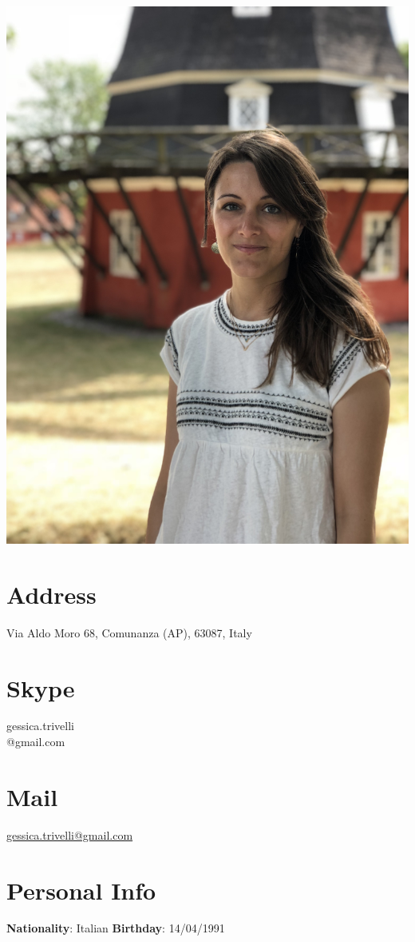 \documentclass[11pt]{friggeri-cv}
\begin{document}
  \begin{aside}
    \includegraphics[width=0.95\columnwidth]{img/IMG_2838}
    \section{Address}\footnotesize{
    Via Aldo Moro 68,
    Comunanza (AP), 63087, Italy}
    \section{Skype}\footnotesize{
    gessica.trivelli\\@gmail.com}
    \section{Mail}\footnotesize{
    \href{mailto:gessica.trivelli@gmail.com}{gessica.trivelli@gmail.com}}
    \section{Personal Info}\footnotesize{
    \textbf{Nationality}: Italian
    \textbf{Birthday}: 14/04/1991}
  \end{aside}
\end{document}
